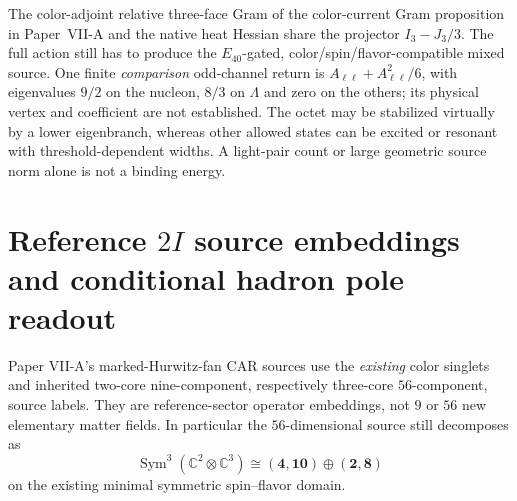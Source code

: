 \documentclass[12pt,a4paper]{article}
\begin{document}
\begin{remark}
\label{p11:rem:v1158-connector-action-frontier}
The color-adjoint relative three-face Gram of
the color-current Gram proposition in Paper~VII-A
and the native heat Hessian share the projector
$I_3-J_3/3$.  The full action still has to produce the
$E_{40}$-gated, color/spin/flavor-compatible mixed source.  One
finite \emph{comparison} odd-channel return is
$A_{\ell\ell}+A_{\ell\ell}^{2}/6$, with eigenvalues
$9/2$ on the nucleon, $8/3$ on $\Lambda$ and zero on the others;
its physical vertex and coefficient are not established.
The octet may be stabilized virtually by a lower eigenbranch,
whereas other allowed states can be excited or resonant with
threshold-dependent widths.  A light-pair count or large geometric
source norm alone is not a binding energy.
\end{remark}


\section{Reference $2I$ source embeddings and conditional hadron pole readout}
\label{p11:sec:v3023-mobile-2i-hadron-readout}
Paper VII-A's marked-Hurwitz-fan CAR sources use the \emph{existing}
color singlets and inherited two-core nine-component, respectively
three-core $56$-component, source labels. They are reference-sector
operator embeddings, not $9$ or $56$ new elementary matter fields.
In particular the $56$-dimensional source still decomposes as
\[
\operatorname{Sym}^3(\mathbb C^2\otimes\mathbb C^3)
 \cong(\mathbf4,\mathbf{10})\oplus(\mathbf2,\mathbf8)
\]
on the existing minimal symmetric spin--flavor domain.
\end{document}
